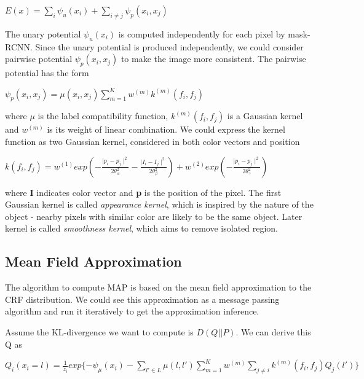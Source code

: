 \documentclass{article}
\begin{document}
\begin{center}
$E(x) = \sum_{i}{\psi_{u}(x_{i})}+\sum_{i\neq j}{\psi_{p}(x_{i}, x_{j})}$
\end{center}

The unary potential $\psi_{u}(x_{i})$ is computed independently for each pixel by mask-RCNN. Since the unary potential is produced independently, we could consider pairwise potential $\psi_{p}(x_{i}, x_{j})$ to make the image more consistent. The pairwise potential has the form

\begin{center}
$\psi_{p}(x_{i}, x_{j}) = \mu (x_{i},x_{j})\sum\limits_{m=1}^K w^{(m)}k^{(m)}(f_{i}, f_{j})$
\end{center}

where $\mu$ is the label compatibility function, $k^{(m)}(f_{i}, f_{j})$ is a Gaussian kernel and $w^{(m)}$ is its weight of linear combination. We could express the kernel function as two Gaussian kernel, considered in both color vectors and position 

\begin{center}
$k(f_{i},f_{j})=w^{(1)}exp(-\frac{\mid p_{i}-p_{j} \mid^{2}}{2\theta_{\alpha}^{2}}-\frac{\mid I_{i}-I_{j} \mid^{2}}{2\theta_{\beta}^{2}}) + w^{(2)}exp(-\frac{\mid p_{i}-p_{j} \mid^{2}}{2\theta_{\gamma}^{2}})$
\end{center}

where \textbf{I} indicates color vector and \textbf{p} is the position of the pixel. The first Gaussian kernel is called \textit{appearance kernel}, which is inspired by the nature of the object - nearby pixels with similar color are likely to be the same object. Later kernel is called \textit{smoothness kernel}, which aims to remove isolated region. 

\subsection{Mean Field Approximation}

The algorithm to compute MAP is based on the mean field approximation to the CRF distribution. We could see this approximation as a message passing algorithm and run it iteratively to get the approximation inference.

Assume the KL-divergence we want to compute is $D(Q||P)$. We can derive this Q as 

\begin{center}
$Q_{i}(x_{i}=l)=\frac{1}{z_{i}}exp\{-\psi_{\mu}(x_{i})-\sum_{l'\in L}\mu(l,l')\sum\limits_{m=1}^K w^{(m)}\sum_{j\neq i}k^{(m)}(f_{i},f_{j})Q_{j}(l')\}$
\end{center}
\end{document}
